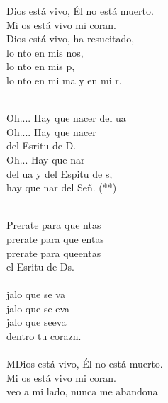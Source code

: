 \begin{cancion}%
	 Dios está vivo, Él no está muerto.\\
	Mi os está vivo mi coran. \\
	 Dios está vivo, ha resucitado,\\
	lo nto en mis nos,\\
	lo nto en mis p,\\
	lo nto en mi ma y en mi r.\\\jump\\
	\begin{chorus}%
	Oh.... Hay que nacer del ua\\
	Oh.... Hay que nacer\\
	del Esritu de D. \\
	Oh... Hay que nar\\
	del ua y del Espitu de s,\\
	hay que nar del Señ. (**) \\
	\end{chorus}%
	\jump\\
	Prerate para que ntas \\
	prerate para que entas \\
	prerate para queentas\\
	el Esritu de Ds. \\
\jump\\
	jalo que se va \\
	jalo que se eva \\
	jalo que seeva\\
	dentro  tu corazn.\\
\jump\\
	MDios está vivo, Él no está muerto.\\
	Mi os está vivo mi coran. \\
	 veo a mi lado, nunca me abandona\\

\end{cancion}
